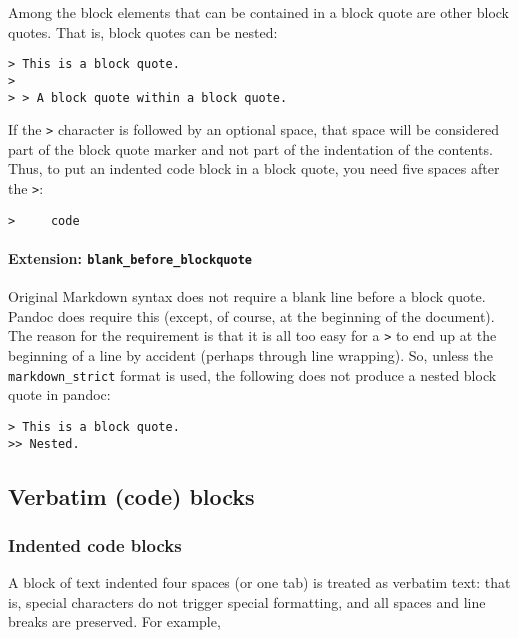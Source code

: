 \documentclass[
]{article}
\begin{document}
Among the block elements that can be contained in a block quote are
other block quotes. That is, block quotes can be nested:

\begin{verbatim}
> This is a block quote.
>
> > A block quote within a block quote.
\end{verbatim}

If the \texttt{\textgreater{}} character is followed by an optional
space, that space will be considered part of the block quote marker and
not part of the indentation of the contents. Thus, to put an indented
code block in a block quote, you need five spaces after the
\texttt{\textgreater{}}:

\begin{verbatim}
>     code
\end{verbatim}

\paragraph{\texorpdfstring{Extension:
\texttt{blank\_before\_blockquote}}{Extension: blank\_before\_blockquote}}\label{extension-blank_before_blockquote}

Original Markdown syntax does not require a blank line before a block
quote. Pandoc does require this (except, of course, at the beginning of
the document). The reason for the requirement is that it is all too easy
for a \texttt{\textgreater{}} to end up at the beginning of a line by
accident (perhaps through line wrapping). So, unless the
\texttt{markdown\_strict} format is used, the following does not produce
a nested block quote in pandoc:

\begin{verbatim}
> This is a block quote.
>> Nested.
\end{verbatim}

\subsection{Verbatim (code) blocks}\label{verbatim-code-blocks}

\subsubsection{Indented code blocks}\label{indented-code-blocks}

A block of text indented four spaces (or one tab) is treated as verbatim
text: that is, special characters do not trigger special formatting, and
all spaces and line breaks are preserved. For example,
\end{document}

